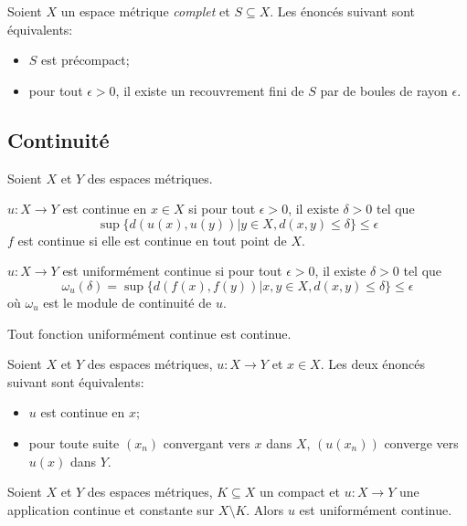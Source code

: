 \begin{mytheo}
  Soient $X$ un espace métrique \emph{complet} et $S \subseteq X$.
  Les énoncés suivant sont équivalents:
  \begin{itemize}
    \item $S$ est précompact;
    \item pour tout $\epsilon > 0$, il existe un recouvrement fini de $S$
      par de boules de rayon $\epsilon$.
  \end{itemize}
\end{mytheo}

\subsection{Continuité}
\begin{mydef}
  Soient $X$ et $Y$ des espaces métriques.
  \begin{description}
    \item $u:X \to Y$ est continue en $x \in X$ si pour tout $\epsilon > 0$,
      il existe $\delta > 0$ tel que
      \[ \sup \{d(u(x), u(y)) | y \in X, d(x,y) \leq \delta\} \leq \epsilon \]
      $f$ est continue si elle est continue en tout point de $X$.
    \item $u:X \to Y$ est uniformément continue si pour tout $\epsilon > 0$,
      il existe $\delta > 0$ tel que
      \[ \omega_u(\delta) = \sup \{d(f(x), f(y)) | x,y \in X, d(x,y) \leq \delta\} \leq \epsilon \]
      où $\omega_u$ est le module de continuité de $u$.
  \end{description}
\end{mydef}

\begin{myprop}
  Tout fonction uniformément continue est continue.
\end{myprop}

\begin{mylem}[3.2]
  Soient $X$ et $Y$ des espaces métriques, $u:X \to Y$
  et $x \in X$.
  Les deux énoncés suivant sont équivalents:
  \begin{itemize}
    \item $u$ est continue en $x$;
    \item pour toute suite $(x_n)$ convergant vers $x$ dans $X$,
      $(u(x_n))$ converge vers $u(x)$ dans $Y$.
  \end{itemize}
\end{mylem}

\begin{myprop}[3.3]
  Soient $X$ et $Y$ des espaces métriques, $K \subseteq X$ un compact
  et $u : X \to Y$ une application continue et constante
  sur $X \setminus K$.
  Alors $u$ est uniformément continue.
\end{myprop}

